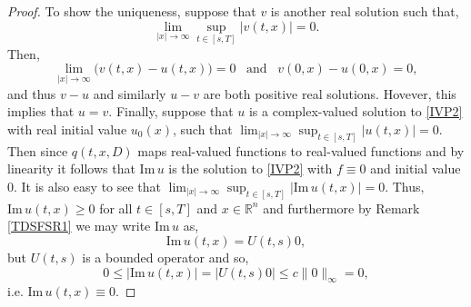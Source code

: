 \documentclass[a4paper, 12pt]{report}
\theoremstyle{cor}
\theoremstyle{remark}
\theoremstyle{definition}
\begin{document}
\begin{proof}
To show the uniqueness, suppose that $v$ is another real solution such that,
$$
\lim_{|x| \to \infty}\sup_{t \in [s, T]}|v(t, x)| = 0.
$$
Then,
$$
\lim_{|x| \to \infty}\big(v(t, x) - u(t, x)\big) = 0 \,\,\,\,\, \text{and} \,\,\,\,\, v(0, x) - u(0, x) = 0,
$$
and thus $v - u$ and similarly $u - v$ are both positive real solutions.  Hovever, this implies that $u = v$.  Finally, suppose that $u$ is a complex-valued solution to \eqref{IVP2} with real initial value $u_0(x)$, such that $\lim_{|x| \to \infty}\sup_{t \in [s, T]}|u(t, x)| = 0$.  Then since $q(t, x, D)$ maps real-valued functions to real-valued functions and by linearity it follows that $\text{Im}\,u$ is the solution to \eqref{IVP2} with $f \equiv 0$ and initial value $0$.  It is also easy to see that $\lim_{|x| \to \infty}\sup_{t \in [s, T]}|\text{Im}\,u(t, x)| = 0$.  Thus, $\text{Im}\,u(t, x) \ge 0$ for all $t \in [s, T]$ and $x \in \mathbb{R}^n$ and furthermore by Remark \ref{TDSFSR1} we may write $\text{Im}\,u$ as,
$$
\text{Im}\,u(t, x) = U(t, s)0,
$$
but $U(t, s)$ is a bounded operator and so,
$$
0 \le |\text{Im}\,u(t, x)| = |U(t, s)0| \le c\|0\|_\infty = 0,
$$
i.e. $\text{Im}\,u(t, x) \equiv 0$.
\end{proof}
\end{document}
